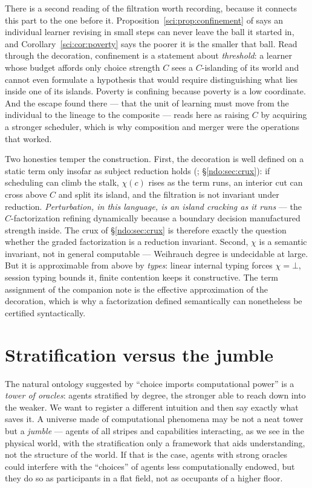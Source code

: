 \noindent
There is a second reading of the filtration worth recording, because it connects this
part to the one before it. Proposition~\ref{sci:prop:confinement} of \chSci says an
individual learner revising in small steps can never leave the ball it started in, and
Corollary~\ref{sci:cor:poverty} says the poorer it is the smaller that ball. Read
through the decoration, confinement is a statement about \emph{threshold}: a learner
whose budget affords only choice strength $C$ sees a $C$-islanding of its world and
cannot even formulate a hypothesis that would require distinguishing what lies inside
one of its islands. Poverty is confining because poverty is a low coordinate. And the
escape found there --- that the unit of learning must move from the individual to the
lineage to the composite --- reads here as raising $C$ by acquiring a stronger
scheduler, which is why composition and merger were the operations that worked.

Two honesties temper the construction. First, the decoration is well defined on a static term only
insofar as subject reduction holds (\cite{choicesched}; \S\ref{ndo:sec:crux}): if scheduling can climb
the stalk, $\chi(c)$ rises as the term runs, an interior cut can cross above $C$ and split its
island, and the filtration is not invariant under reduction. \emph{Perturbation, in this language,
is an island cracking as it runs} --- the $C$-factorization refining dynamically because a boundary
decision manufactured strength inside. The crux of \S\ref{ndo:sec:crux} is therefore exactly the
question whether the graded factorization is a reduction invariant. Second, $\chi$ is a semantic
invariant, not in general computable --- Weihrauch degree is undecidable at large. But it is
approximable from above by \emph{types}: linear internal typing forces $\chi = \bot$, session typing
bounds it, finite contention keeps it constructive. The term assignment of the companion note is the
effective approximation of the decoration, which is why a factorization defined semantically can
nonetheless be certified syntactically.


\section{Stratification versus the jumble}\label{ndo:sec:jumble}

The natural ontology suggested by ``choice imports computational power'' is a
\emph{tower of oracles}: agents stratified by degree, the stronger able to reach
down into the weaker. We want to register a different intuition and then say
exactly what saves it. A universe made of computational phenomena may be not a
neat tower but a \emph{jumble} --- agents of all stripes and capabilities
interacting, as we see in the physical world, with the stratification only a
framework that aids understanding, not the structure of the world. If that is the
case, agents with strong oracles could interfere with the ``choices'' of agents
less computationally endowed, but they do so as participants in a flat field, not
as occupants of a higher floor.

